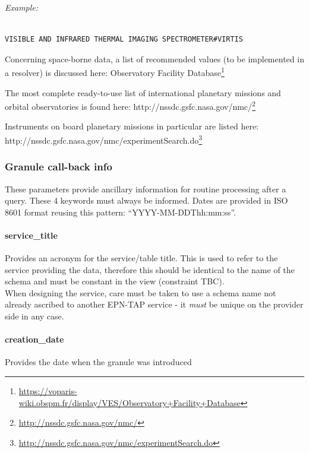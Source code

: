 \documentclass[11pt,a4paper]{ivoa}
\begin{document}
\emph{\emph{Example:}}

\begin{verbatim}

VISIBLE AND INFRARED THERMAL IMAGING SPECTROMETER#VIRTIS

\end{verbatim}

Concerning space-borne data, a list of recommended values (to be implemented in a resolver) is discussed here: Observatory Facility Database\footnote{\url{https://voparis-wiki.obspm.fr/display/VES/Observatory+Facility+Database}}

The most complete ready-to-use list of international planetary missions and orbital observatories is found here: http://nssdc.gsfc.nasa.gov/nmc/\footnote{\url{http://nssdc.gsfc.nasa.gov/nmc/}}

Instruments on board planetary missions in particular are listed here: http://nssdc.gsfc.nasa.gov/nmc/experimentSearch.do\footnote{\url{http://nssdc.gsfc.nasa.gov/nmc/experimentSearch.do}}

\subsubsection{Granule call-back info}

These parameters provide ancillary information for routine processing after a query. These 4 keywords must always be informed. Dates are provided in ISO 8601 format reusing this pattern: “YYYY-MM-DDThh:mm:ss”. 

\paragraph{service\_title}

Provides an acronym for the service/table title. This is used to refer to the service providing the data, therefore this should be identical to the name of the schema and must be constant in the view (constraint TBC).\\When designing the service, care must be taken to use a schema name not already ascribed to another EPN-TAP service - it \emph{must} be unique on the provider side in any case.

\paragraph{creation\_date}

Provides the date when the granule was introduced
\end{document}

